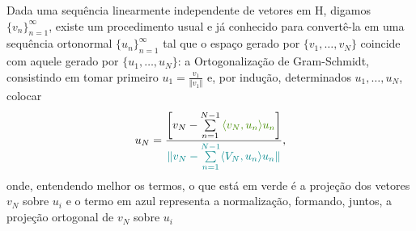 \documentclass[../functional_analysis.tex]{subfiles}
\begin{document}
Dada uma sequência linearmente independente de vetores em H, digamos \(\{v_{n}\}_{n=1}^{\infty}\), existe um procedimento usual e já conhecido para convertê-la em uma sequência ortonormal \(\{u_{n}\}_{n=1}^{\infty}\) tal que o espaço gerado por \(\{v_{1}, \dotsc , v_{N}\}\) coincide com aquele gerado por \(\{u_{1},\dotsc , u_{N}\}\): a \hypertarget{gram_schmidt}{Ortogonalização de Gram-Schmidt}, consistindo em tomar primeiro \(u_1 = \frac{v_1}{\Vert v_1 \Vert}\) e, por indução, determinados \(u_1,\dotsc ,u_{N}\), colocar
\[
	u_{N} = \frac{ \biggl[v_{N}-\sum\limits_{n=1}^{N-1}{\color{Chartreuse4}\langle v_{N}, u_{n} \rangle u_{n}}\biggr]}{{\color{Turquoise4}\Vert v_{N} -\sum\limits_{n=1}^{N-1}\langle V_{N}, u_{n} \rangle u_{n}\Vert}},
\]
onde, entendendo melhor os termos, o que está {\color{Chartreuse4}em verde é a projeção dos vetores \(v_{N}\) sobre \(u_{i}\)} e o termo {\color{Turquoise4}em azul representa a normalização}, formando, juntos, a projeção ortogonal de \(v_{N}\) sobre \(u_{i}\)
\end{document}
